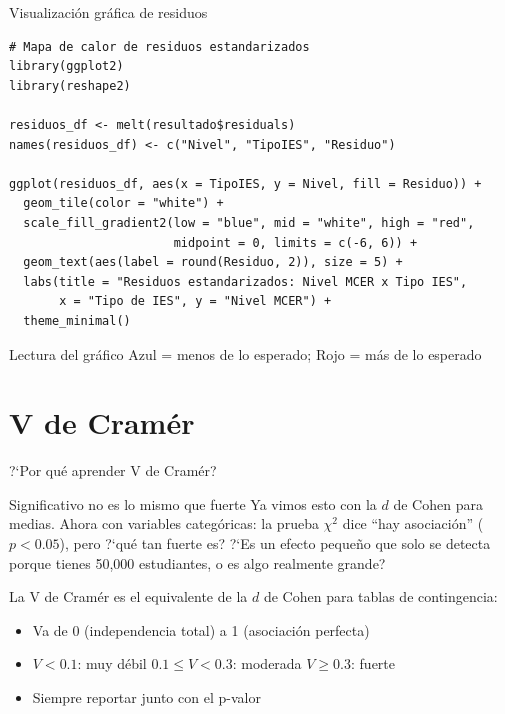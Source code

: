 \documentclass[aspectratio=169, 11pt]{beamer}
\begin{document}
\begin{frame}[fragile]{Visualización gráfica de residuos}
\begin{lstlisting}[basicstyle=\ttfamily\scriptsize]
# Mapa de calor de residuos estandarizados
library(ggplot2)
library(reshape2)

residuos_df <- melt(resultado$residuals)
names(residuos_df) <- c("Nivel", "TipoIES", "Residuo")

ggplot(residuos_df, aes(x = TipoIES, y = Nivel, fill = Residuo)) +
  geom_tile(color = "white") +
  scale_fill_gradient2(low = "blue", mid = "white", high = "red",
                       midpoint = 0, limits = c(-6, 6)) +
  geom_text(aes(label = round(Residuo, 2)), size = 5) +
  labs(title = "Residuos estandarizados: Nivel MCER x Tipo IES",
       x = "Tipo de IES", y = "Nivel MCER") +
  theme_minimal()
\end{lstlisting}

\begin{block}{Lectura del gráfico}
Azul = menos de lo esperado; Rojo = más de lo esperado
\end{block}
\end{frame}

\section{V de Cramér}

\begin{frame}{?`Por qu\'e aprender V de Cram\'er?}
\small
\begin{exampleblock}{Significativo no es lo mismo que fuerte}
Ya vimos esto con la $d$ de Cohen para medias. Ahora con variables categ\'oricas: la prueba $\chi^2$ dice ``hay asociaci\'on'' ($p < 0.05$), pero ?`qu\'e tan fuerte es? ?`Es un efecto peque\~no que solo se detecta porque tienes 50{,}000 estudiantes, o es algo realmente grande?
\end{exampleblock}

\vspace{0.2cm}
La V de Cram\'er es el equivalente de la $d$ de Cohen para tablas de contingencia:
\begin{itemize}\setlength{\itemsep}{1pt}
  \item Va de 0 (independencia total) a 1 (asociaci\'on perfecta)
  \item $V < 0.1$: muy d\'ebil \quad $0.1 \leq V < 0.3$: moderada \quad $V \geq 0.3$: fuerte
  \item Siempre reportar junto con el p-valor
\end{itemize}
\end{frame}
\end{document}
